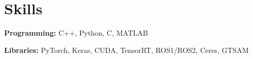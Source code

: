 \documentclass[letterpaper,11pt]{article}
\newcommand{\resumeSubHeadingListStart}{\begin{itemize}[leftmargin=0.15in, label={}]}
\newcommand{\resumeSubHeadingListEnd}{\end{itemize}}
\begin{document}
				
				
				
				



\section{Skills}
	\vspace{2pt}
	\resumeSubHeadingListStart
		\small{\item{
				\textbf{Programming:}{ C++, Python, C, MATLAB} \\ \vspace{3pt}
				
				\textbf{Libraries:}{ PyTorch, Keras, CUDA, TensorRT, ROS1/ROS2, Ceres, GTSAM} \\ \vspace{3pt}
				
				
		}}
	\resumeSubHeadingListEnd
\end{document}
